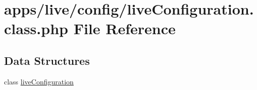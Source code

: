 \hypertarget{live_configuration_8class_8php}{\section{apps/live/config/live\-Configuration.class.\-php File Reference}
\label{live_configuration_8class_8php}
}
\subsection*{Data Structures}
\begin{DoxyCompactItemize}
\item 
class \hyperlink{classlive_configuration}{live\-Configuration}
\end{DoxyCompactItemize}
